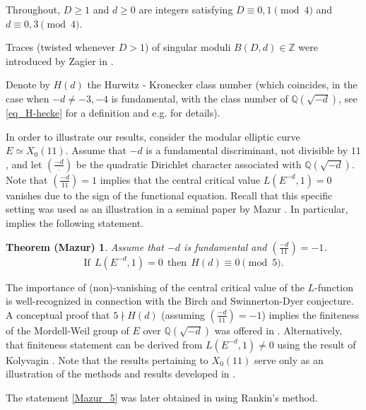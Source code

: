 \documentclass[11pt,letterpaper]{amsart}
\newcommand{\Z}{{\mathbb Z}}
\newcommand{\Q}{{\mathbb Q}}
\newtheorem*{Mazur_5} {Theorem (Mazur)}
\theoremstyle{remark}
\begin{document}
Throughout, $D \geq 1$ and $d \geq 0$ are  integers satisfying $D \equiv 0,1 \pmod 4$ and $d \equiv 0,3 \pmod 4$.

Traces (twisted whenever $D>1$) of singular moduli $B(D,d) \in \Z$ were introduced by Zagier in \cite{Zagier_traces}.  

Denote by $H(d)$ the Hurwitz - Kronecker class number (which coincides, in the case when  $-d\neq -3,-4$ is fundamental, with the class number of  $\Q\left(\sqrt{-d}\right)$, see \eqref{eq_H-hecke} for a definition and e.g. \cite{Cohen} for details).

In order to illustrate our results, consider the modular elliptic curve $E \simeq X_0(11)$. Assume that $-d$ is a fundamental discriminant, not divisible by $11$, and
let $ \left( \frac{-d}{\cdot} \right)$ be the quadratic Dirichlet character associated with $\Q\left(\sqrt{-d}\right)$. 
Note that $ \left( \frac{-d}{11} \right) = 1$ implies that the central critical value $L(E^{-d},1) = 0$ vanishes due to the sign of the functional equation. 
Recall that this specific setting was used as an illustration in a seminal paper by  Mazur \cite{Mazur}. In particular, \cite[Theorem 1]{Mazur} implies the following statement.

\begin{Mazur_5} 
Assume that $-d$ is fundamental and $ \left( \frac{-d}{11} \right) = -1$. 
\begin{equation} \label{Mazur_5}
\text{If} ~~ L(E^{-d},1) = 0 ~~ \text{then} ~~ H(d) \equiv 0 \pmod{5}. 
\end{equation}
\end{Mazur_5}

The importance of (non)-vanishing of the central critical value of the $L$-function is well-recognized in connection with the Birch and Swinnerton-Dyer conjecture. A conceptual proof that $5 \nmid H(d)$ (assuming $ \left( \frac{-d}{11} \right) = -1$)
implies the finiteness of the Mordell-Weil group of $E$ over $\Q\left(\sqrt{-d}\right)$ was offered in \cite{Mazur}. Alternatively, that finiteness statement can be derived from $L(E^{-d},1) \neq 0$ using the  result of Kolyvagin \cite{Kolyvagin}. Note that the results pertaining to $X_0(11)$ serve only as an illustration of the methods and results developed in \cite{Mazur}.

The statement  \eqref{Mazur_5}  was later obtained in \cite{Gue-Pan} using Rankin's method. 
\end{document}
